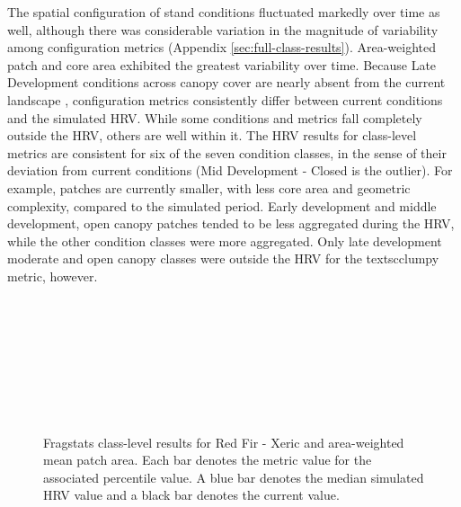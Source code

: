 The spatial configuration of stand conditions fluctuated markedly over time as well, although there was considerable variation in the magnitude of variability among configuration metrics (Appendix \ref{sec:full-class-results}). Area-weighted patch and core area exhibited the greatest variability over time. Because Late Development conditions across canopy cover are nearly absent from the current landscape , configuration metrics consistently differ between current conditions and the simulated HRV. While some conditions and metrics fall completely outside the HRV, others are well within it. The HRV results for class-level metrics are consistent for six of the seven condition classes, in the sense of their deviation from current conditions (Mid Development - Closed is the outlier). For example, patches are currently smaller, with less core area and geometric complexity, compared to the simulated period. Early development and middle development, open canopy patches tended to be less aggregated during the HRV, while the other condition classes were more aggregated. Only late development moderate and open canopy classes were outside the HRV for the textsc{clumpy} metric, however.

\begin{figure}[!htbp]
  \\%
  \\%
    \\%
    \\%
    \\%
    \\%
    \\%
  \caption{Fragstats class-level results for Red Fir - Xeric and area-weighted mean patch area. Each bar denotes the metric value for the associated percentile value. A blue bar denotes the median simulated HRV value and a black bar denotes the current value.}
  \label{fig:rfrx_areaam}
\end{figure}

